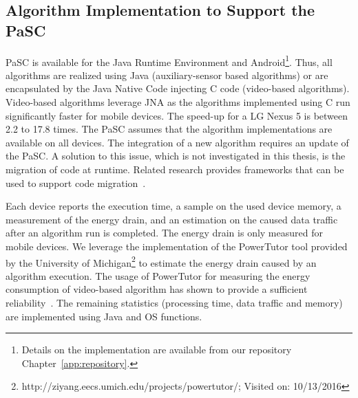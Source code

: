 \subsection{Algorithm Implementation to Support the PaSC}
PaSC is available for the Java Runtime Environment and Android\footnote{Details on the implementation are available from our repository Chapter~\ref{app:repository}.}.
Thus, all algorithms are realized using Java (auxiliary-sensor based algorithms) or are encapsulated by the Java Native Code injecting C code (video-based algorithms).
Video-based algorithms leverage \ac{JNA} as the algorithms implemented using C run significantly faster for mobile devices. 
The speed-up for a LG Nexus 5 is between 2.2 to 17.8 times.
The \ac{PaSC} assumes that the algorithm implementations are available on all devices.
The integration of a new algorithm requires an update of the \ac{PaSC}. 
A solution to this issue, which is not investigated in this thesis, is the migration of code at runtime. 
Related research provides frameworks that can be used to support code migration~\cite{Aitenbichler2007}.

Each device reports the execution time, a sample on the used device memory, a measurement of the energy drain, and an estimation on the caused data traffic after an algorithm run is completed.
The energy drain is only measured for mobile devices.
We leverage the implementation of the PowerTutor tool provided by the University of Michigan\footnote{http://ziyang.eecs.umich.edu/projects/powertutor/; Visited on: 10/13/2016} to estimate the energy drain caused by an algorithm execution.
The usage of PowerTutor for measuring the energy consumption of video-based algorithm has shown to provide a sufficient reliability~\cite{Ganiyu2012}.
The remaining statistics (processing time, data traffic and memory) are implemented using Java and \ac{OS} functions.